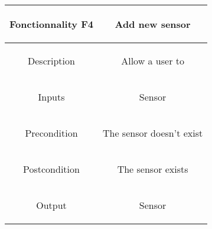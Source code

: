 \documentclass{report}
\begin{document}
\begin{center}
	\begin{tabular}{|c|c|}
	\hline
	\begin{bf}Fonctionnality F4\end{bf} & \begin{bf}Add new sensor\end{bf} \\
	\hline
	\begin{bf}Description\end{bf} & \begin{bf}Allow a user to\end{bf}  \\
	\hline
	\begin{bf}Inputs\end{bf} & \begin{bf}Sensor\end{bf} \\
	\hline
	\begin{bf}Precondition\end{bf} & \begin{bf}The sensor doesn't exist\end{bf}  \\
	\hline
	\begin{bf}Postcondition\end{bf} & \begin{bf}The sensor exists\end{bf} \\
	\hline
	\begin{bf}Output\end{bf} & \begin{bf}Sensor\end{bf} \\
	\hline
	\end{tabular}
\end{center}
\end{document}
